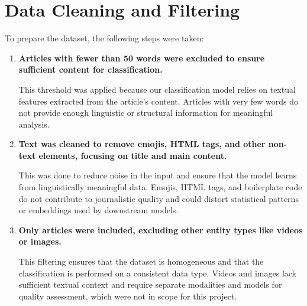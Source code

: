 



\section{Data Cleaning and Filtering}
To prepare the dataset, the following steps were taken:

\begin{enumerate}
  \item \textbf{Articles with fewer than 50 words were excluded to ensure sufficient content for classification.}
  
  This threshold was applied because our classification model relies on textual features extracted from the article's content. Articles with very few words do not provide enough linguistic or structural information for meaningful analysis.
  \item \textbf{Text was cleaned to remove emojis, HTML tags, and other non-text elements, focusing on title and main content.}
  
  This was done to reduce noise in the input and ensure that the model learns from linguistically meaningful data. Emojis, HTML tags, and boilerplate code do not contribute to journalistic quality and could distort statistical patterns or embeddings used by downstream models.
  \item \textbf{Only articles were included, excluding other entity types like videos or images.}
  
  This filtering ensures that the dataset is homogeneous and that the classification is performed on a consistent data type. Videos and images lack sufficient textual context and require separate modalities and models for quality assessment, which were not in scope for this project.
\end{enumerate}

